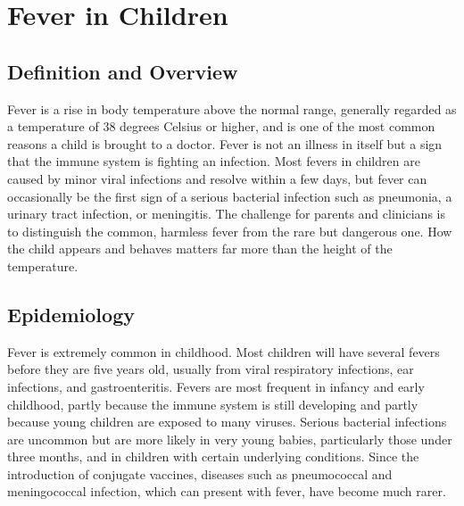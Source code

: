 \chapter{Fever in Children}

\section*{Definition and Overview}
Fever is a rise in body temperature above the normal range, generally regarded as a temperature of 38 degrees Celsius or higher, and is one of the most common reasons a child is brought to a doctor. Fever is not an illness in itself but a sign that the immune system is fighting an infection. Most fevers in children are caused by minor viral infections and resolve within a few days, but fever can occasionally be the first sign of a serious bacterial infection such as pneumonia, a urinary tract infection, or meningitis. The challenge for parents and clinicians is to distinguish the common, harmless fever from the rare but dangerous one. How the child appears and behaves matters far more than the height of the temperature.

\section*{Epidemiology}
Fever is extremely common in childhood. Most children will have several fevers before they are five years old, usually from viral respiratory infections, ear infections, and gastroenteritis. Fevers are most frequent in infancy and early childhood, partly because the immune system is still developing and partly because young children are exposed to many viruses. Serious bacterial infections are uncommon but are more likely in very young babies, particularly those under three months, and in children with certain underlying conditions. Since the introduction of conjugate vaccines, diseases such as pneumococcal and meningococcal infection, which can present with fever, have become much rarer.

